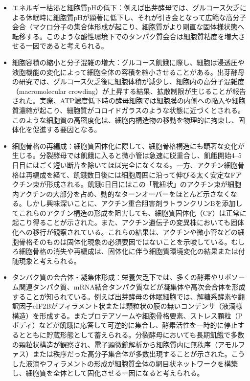 \begin{itemize}
    \item エネルギー枯渇と細胞質pHの低下：例えば出芽酵母では、グルコース欠乏による休眠時に細胞質pHが顕著に低下し、それが引き金となって広範な高分子会合（マクロ分子の集合体形成が起こり、細胞質がより剛直な固体様状態へ転移する。このような酸性環境下でのタンパク質会合は細胞質粘度を増大させる一因であると考えられる。
    \item 細胞容積の縮小と分子混雑の増大：グルコース飢餓に際し、細胞は浸透圧や液胞機能の変化によって細胞全体の容積を縮小させることがある。出芽酵母の研究では、グルコース欠乏後に細胞体積が減少し、細胞内の高分子混雑度（macromolecular crowding）が上昇する結果、拡散制限が生じることが報告された。実際、ATP濃度低下時の酵母細胞では細胞膜の内側への陥入や細胞質濃縮が起こり、細胞質がコロイドガラスのような状態に近づくとされる。このような細胞質の高密度化は、細胞内構造物の移動を物理的に拘束し、固体化を促進する要因となる。
    \item 細胞骨格の再編成：細胞質固体化に際して、細胞骨格構造にも顕著な変化が生じる。分裂酵母では飢餓に入ると微小管は急速に脱重合し、飢餓開始4–5日目にはごく短い断片を除いてほぼ完全になくなる。一方、アクチン細胞骨格は再編成を経て、飢餓数日後には細胞周囲に沿って伸びる太く安定なFアクチン束が形成される。飢餓6日目にはこの「靴紐状」のアクチン束が細胞内アクチンの大部分を占め、動的なターンオーバーをほとんど示さなくなる。しかし興味深いことに、アクチン重合阻害剤ラトランクリンBを添加してこれらのアクチン構造の形成を阻害しても、細胞質固体化（CF）は正常に起こり得ることが示された。また、アクチン遺伝子の変異株においても固体化への移行が観察されている。これらの結果は、アクチンや微小管などの細胞骨格そのものは固体化現象の必須要因ではないことを示唆している。むしろ細胞骨格の消失や再編成は、固体化に伴う細胞質環境変化の結果または付随現象と考えられる。
    \item タンパク質の会合体・凝集体形成：栄養欠乏下では、多くの酵素やリボソーム関連タンパク質、mRNA結合タンパク質などが凝集体や高次会合体を形成することが知られている。例えば出芽酵母の休眠細胞では、解糖系酵素や翻訳因子eIF2Bがフィラメント状または顆粒状の膜の無いコンデンサ（液滴様構造）を形成する。またプロテアソームや細胞骨格要素、ストレス顆粒（Pボディ）などが飢餓に応答して可逆的に集合し、酵素活性を一時的に停止するとともに貯蔵形態として蓄えられる。分裂酵母においても長期飢餓で多数の顆粒状構造が観察され、電子顕微鏡解析から細胞質内に無秩序（アモルファス）または秩序だった高分子集合体が多数出現することが示された。こうした液滴やフィラメントの形成が細胞質全体の網目状ネットワークを構築し、細胞質を全体として固化させる一因になると考えられる。

\end{itemize}
